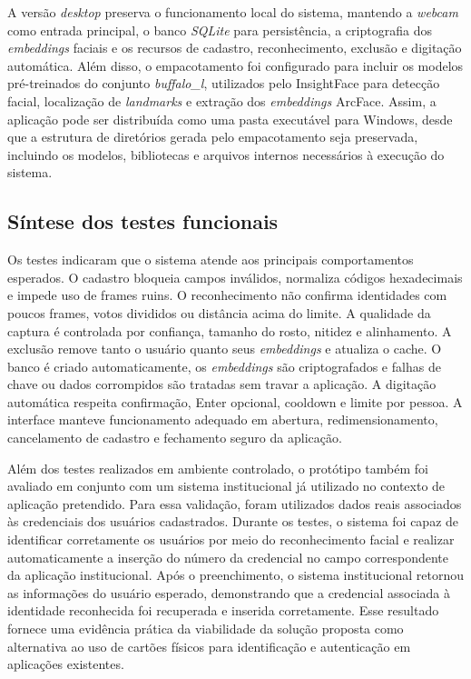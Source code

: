 A versão \textit{desktop} preserva o funcionamento local do sistema, mantendo a \textit{webcam} como entrada principal, o banco \textit{SQLite} para persistência, a criptografia dos \textit{embeddings} faciais e os recursos de cadastro, reconhecimento, exclusão e digitação automática. Além disso, o empacotamento foi configurado para incluir os modelos pré-treinados do conjunto \textit{buffalo\_l}, utilizados pelo InsightFace para detecção facial, localização de \textit{landmarks} e extração dos \textit{embeddings} ArcFace. Assim, a aplicação pode ser distribuída como uma pasta executável para Windows, desde que a estrutura de diretórios gerada pelo empacotamento seja preservada, incluindo os modelos, bibliotecas e arquivos internos necessários à execução do sistema.

\subsection{Síntese dos testes funcionais}

Os testes indicaram que o sistema atende aos principais comportamentos esperados. O cadastro bloqueia campos inválidos, normaliza códigos hexadecimais e impede uso de frames ruins. O reconhecimento não confirma identidades com poucos frames, votos divididos ou distância acima do limite. A qualidade da captura é controlada por confiança, tamanho do rosto, nitidez e alinhamento. A exclusão remove tanto o usuário quanto seus \textit{embeddings} e atualiza o cache. O banco é criado automaticamente, os \textit{embeddings} são criptografados e falhas de chave ou dados corrompidos são tratadas sem travar a aplicação. A digitação automática respeita confirmação, Enter opcional, cooldown e limite por pessoa. A interface manteve funcionamento adequado em abertura, redimensionamento, cancelamento de cadastro e fechamento seguro da aplicação.

Além dos testes realizados em ambiente controlado, o protótipo também foi avaliado em conjunto com um sistema institucional já utilizado no contexto de aplicação pretendido. Para essa validação, foram utilizados dados reais associados às credenciais dos usuários cadastrados. Durante os testes, o sistema foi capaz de identificar corretamente os usuários por meio do reconhecimento facial e realizar automaticamente a inserção do número da credencial no campo correspondente da aplicação institucional. Após o preenchimento, o sistema institucional retornou as informações do usuário esperado, demonstrando que a credencial associada à identidade reconhecida foi recuperada e inserida corretamente. Esse resultado fornece uma evidência prática da viabilidade da solução proposta como alternativa ao uso de cartões físicos para identificação e autenticação em aplicações existentes.
